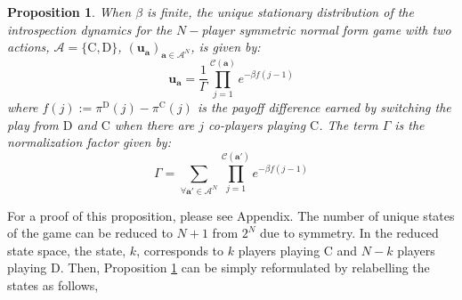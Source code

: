 \documentclass[11pt]{article}
\theoremstyle{plainCl1}
\newtheorem{Prop}{Proposition}
\theoremstyle{plainCl2}
\newcommand{\abf}{\mathbf{a}}
\newcommand{\ubf}{\mathbf{u}}
\newcommand{\C}{\mathrm{C}}
\newcommand{\D}{\mathrm{D}}
\begin{document}
\begin{Prop}
\label{Prop:Symmetric-2-strategies-state}
When $\beta$ is finite, the unique stationary distribution of the introspection dynamics for the $N-$player symmetric normal form game with two actions, $\mathcal{A} = \{\C, \D \}$, $(\ubf_{\abf})_{\abf \in \mathcal{A}^N}$, is given by:
\begin{equation}
\label{Eq:stationary-dist-symm-2-stgs-state}
\ubf_\abf = \frac{1}{\Gamma} \displaystyle \prod_{j=1}^{\mathcal{C}(\abf)} \displaystyle e^{-\beta f(j-1)}
\end{equation}
where $f(j) := \pi^\D(j) - \pi^\C(j)$ is the payoff difference earned by switching the play from $\D$ and $\C$ when there are $j$ co-players playing $\C$. The term $\Gamma$ is the normalization factor given by:
\begin{equation}
\label{Eq:stationary-dist-normalization-symm-2-stgs-state}
\Gamma = \displaystyle \sum_{\forall \abf' \in \mathcal{A}^N} \prod_{j = 1}^{\mathcal{C}(\abf')} \displaystyle e^{-\beta f(j-1)}
\end{equation}
\end{Prop}


\noindent For a proof of this proposition, please see Appendix. The number of unique states of the game can be reduced to $N+1$ from $2^N$ due to symmetry. In the reduced state space, the state, $k$, corresponds to $k$ players playing $\C$ and $N-k$ players playing $\D$. Then, Proposition \ref{Prop:Symmetric-2-strategies-state} can be simply reformulated by relabelling the states as follows,
\end{document}
